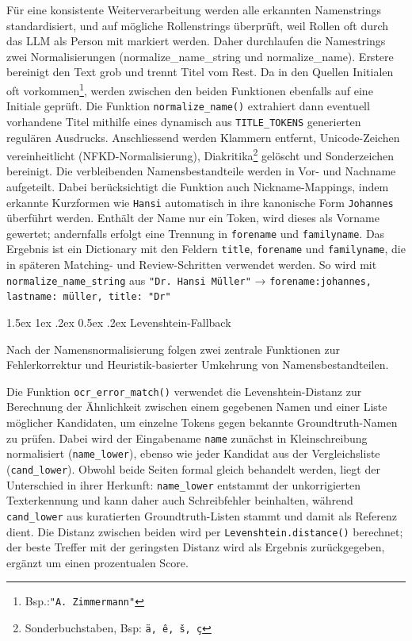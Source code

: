 \documentclass[12pt, a4paper, ngerman, bidi=default]{article}
\makeatletter
\newcommand{\code}[1]{\colorbox{VeryLightGray}{\texttt{#1}}} %
\let\oldparagraph\paragraph%
\renewcommand{\paragraph}{
    \@ifstar%
      \xxxParagraphStar%
      \xxxParagraphNoStar%
 }
\newcommand{\xxxParagraphStar}[1]{\oldparagraph*{#1}\mbox{}}
\newcommand{\xxxParagraphNoStar}[1]{\oldparagraph{#1}\mbox{}}
\renewcommand\paragraph{\@startsection{paragraph}{4}{0em}%
  {1.5ex \@plus1ex \@minus.2ex}%
  {0.5ex \@plus.2ex}%
  {\normalfont\normalsize\bfseries\itshape}}
\makeatother
\begin{document}
Für eine konsistente Weiterverarbeitung werden alle erkannten Namenstrings standardisiert, und auf mögliche Rollenstrings überprüft, weil Rollen oft durch das LLM als Person mit markiert werden. Daher durchlaufen die Namestrings zwei Normalisierungen (normalize\_name\_string und normalize\_name). Erstere bereinigt den Text grob und trennt Titel vom Rest. Da in den Quellen Initialen oft vorkommen\footnote{Bsp.:\texttt{"A. Zimmermann"}}, werden zwischen den beiden Funktionen ebenfalls auf eine Initiale geprüft.
Die Funktion \code{normalize\_name()} extrahiert dann eventuell vorhandene Titel mithilfe eines dynamisch aus \code{TITLE\_TOKENS} generierten regulären Ausdrucks. Anschliessend werden Klammern entfernt, Unicode-Zeichen vereinheitlicht (NFKD-Normalisierung), Diakritika\footnote{Sonderbuchstaben, Bsp: \texttt{ä, ê, š, ç}} gelöscht und Sonderzeichen bereinigt.
Die verbleibenden Namensbestandteile werden in Vor- und Nachname aufgeteilt. Dabei berücksichtigt die Funktion auch Nickname-Mappings, indem erkannte Kurzformen wie \texttt{Hansi} automatisch in ihre kanonische Form \texttt{Johannes} überführt werden. Enthält der Name nur ein Token, wird dieses als Vorname gewertet; andernfalls erfolgt eine Trennung in \code{forename} und \code{familyname}. Das Ergebnis ist ein Dictionary mit den Feldern \code{title}, \code{forename} und \code{familyname}, die in späteren Matching- und Review-Schritten verwendet werden. So wird mit \code{normalize\_name\_string} aus \texttt{"Dr. Hansi Müller"}
→ \texttt{\code{forename}:johannes, \code{lastname}: müller, \code{title}: "Dr"}

\paragraph{ Levenshtein-Fallback}\label{paragraph:Pers_match/Fallback}

Nach der Namensnormalisierung folgen zwei zentrale Funktionen zur Fehlerkorrektur und Heuristik-basierter Umkehrung von Namensbestandteilen.

Die Funktion \code{ocr\_error\_match()} verwendet die Levenshtein-Distanz zur Berechnung der Ähnlichkeit zwischen einem gegebenen Namen und einer Liste möglicher Kandidaten, um einzelne Tokens gegen bekannte Groundtruth-Namen zu prüfen. Dabei wird der Eingabename \code{name} zunächst in Kleinschreibung normalisiert (\code{name\_lower}), ebenso wie jeder Kandidat aus der Vergleichsliste (\code{cand\_lower}).
Obwohl beide Seiten formal gleich behandelt werden, liegt der Unterschied in ihrer Herkunft: \code{name\_lower} entstammt der unkorrigierten Texterkennung und kann daher auch Schreibfehler beinhalten, während \code{cand\_lower} aus kuratierten Groundtruth-Listen stammt und damit als Referenz dient.
Die Distanz zwischen beiden wird per \code{Levenshtein.distance()} berechnet; der beste Treffer mit der geringsten Distanz wird als Ergebnis zurückgegeben, ergänzt um einen prozentualen Score.
\end{document}

